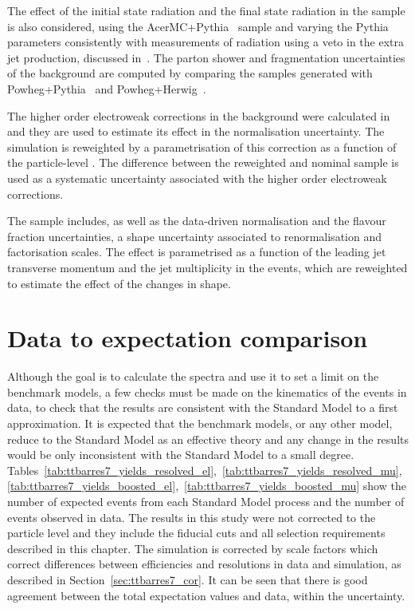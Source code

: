 The effect of the initial state radiation and the final state radiation in the \ttbar sample is also considered, using the
AcerMC+Pythia~\cite{acermc,pythia} sample and varying the Pythia parameters consistently with measurements of \ttbar radiation using a veto in the extra jet production, discussed
in~\cite{gapfraction}. The parton shower and fragmentation uncertainties of the \ttbar background are computed by comparing the samples generated with
Powheg+Pythia~\cite{powheg,pythia} and Powheg+Herwig~\cite{powheg,herwig1,herwig2}.

The higher order electroweak corrections in the \ttbar background were calculated in~\cite{ttbar_electroweak} and they
are used to estimate its effect in the \ttbar normalisation uncertainty. The \ttbar simulation is reweighted by a parametrisation of this correction as a function of the particle-level \mtt. The difference between the reweighted and nominal \ttbar sample is used as a systematic uncertainty associated with the higher order electroweak corrections.

The \wjets sample includes, as well as the data-driven normalisation and the flavour fraction uncertainties, a shape uncertainty associated to renormalisation and
factorisation scales. The effect is parametrised as a function of the leading jet transverse momentum and the jet multiplicity in the events, which are reweighted to
estimate the effect of the changes in shape.


\section{Data to expectation comparison}
\label{sec:ttbarres7_datamc}

Although the goal is to calculate the \mtt spectra and use it to set a limit on the benchmark models, a few checks must be made on the kinematics of the events
in data, to check that the results are consistent with the Standard Model to a first approximation. It is expected that the benchmark models, or any other model,
reduce to the Standard Model as an effective theory and any change in the results would be only inconsistent with the Standard Model to a small degree.
Tables~\ref{tab:ttbarres7_yields_resolved_el},~\ref{tab:ttbarres7_yields_resolved_mu},~\ref{tab:ttbarres7_yields_boosted_el},~\ref{tab:ttbarres7_yields_boosted_mu}
show the number of expected events from each Standard Model process and the number of events observed in data. The results in this study were not
corrected to the particle level and they include the fiducial cuts
and all selection requirements described in this chapter. The simulation
is corrected by scale factors which correct differences between efficiencies
and resolutions in data and simulation, as described in
Section~\ref{sec:ttbarres7_cor}.
It can be seen that there is good agreement between the
total expectation values and data, within the uncertainty.

